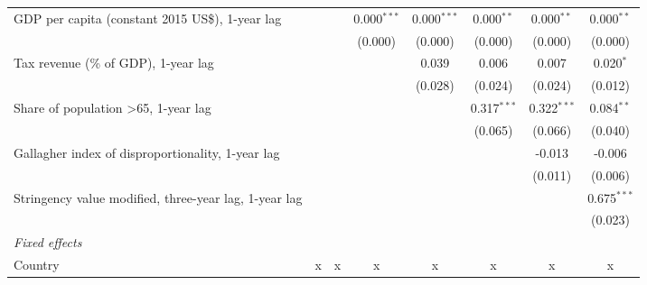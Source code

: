 \begin{tabular}{lccccccc}
   GDP per capita (constant 2015 US\$), 1-year lag                                          &              &              & 0.000$^{***}$ & 0.000$^{***}$ & 0.000$^{**}$   & 0.000$^{**}$   & 0.000$^{**}$\\   
                                                                                            &              &              & (0.000)       & (0.000)       & (0.000)        & (0.000)        & (0.000)\\   
   Tax revenue (\% of GDP), 1-year lag                                                      &              &              &               & 0.039         & 0.006          & 0.007          & 0.020$^{*}$\\   
                                                                                            &              &              &               & (0.028)       & (0.024)        & (0.024)        & (0.012)\\   
   Share of population >65, 1-year lag                                                      &              &              &               &               & 0.317$^{***}$  & 0.322$^{***}$  & 0.084$^{**}$\\   
                                                                                            &              &              &               &               & (0.065)        & (0.066)        & (0.040)\\   
   Gallagher index of disproportionality, 1-year lag                                        &              &              &               &               &                & -0.013         & -0.006\\   
                                                                                            &              &              &               &               &                & (0.011)        & (0.006)\\   
   Stringency value modified, three-year lag, 1-year lag                                    &              &              &               &               &                &                & 0.675$^{***}$\\   
                                                                                            &              &              &               &               &                &                & (0.023)\\   
   \emph{Fixed effects}\\
   Country                                                                                  & x            & x            & x             & x             & x              & x              & x\\  

\end{tabular}
